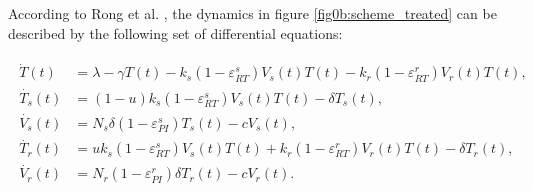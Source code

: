 
According to Rong et al. \cite{rong2007emergence}, the dynamics in figure \ref{fig0b:scheme_treated} can be described by the following set 
of differential equations:

\begin{align}
    \begin{split}
        \dot{T}(t) &= \lambda - \gamma T(t) - k_s (1 - \varepsilon_{RT}^s) V_s(t) T(t) - k_r (1 - \varepsilon_{RT}^r) V_r(t) T(t),\\
        \dot{T_s}(t) &= (1-u)k_s(1 - \varepsilon_{RT}^s)V_s(t)T(t) - \delta T_s(t),\\
        \dot{V_s}(t) &= N_s \delta (1 - \varepsilon_{PI}^s) T_s(t) - c V_s(t),\\
        \dot{T_r}(t) &= u k_s (1 - \varepsilon_{RT}^s) V_s(t) T(t) + k_r (1 - \varepsilon_{RT}^r) V_r(t) T(t) - \delta T_r(t),\\
        \dot{V_r}(t) &= N_r (1 - \varepsilon_{PI}^r) \delta T_r(t) - c V_r(t).
    \end{split}
    \label{equ:HIVmodel}
\end{align}


